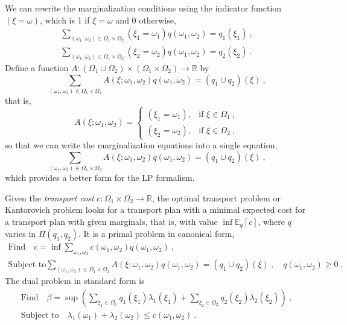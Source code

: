 \documentclass[axioms,article,submit,pdftex,moreauthors]{Definitions/mdpi}
\theoremstyle{plain}
\theoremstyle{remark}
\newcommand{\Expectation}{\mathbb E}
\newcommand{\expectat}[2]{\Expectation_{#1}\left[#2\right]}
\newcommand{\reals}{\mathbb{R}}
\begin{document}
We can rewrite the marginalization conditions using the indicator function \((\xi = \omega)\), which is 1 if \( \xi = \omega \) and 0 otherwise,
     \begin{gather*} 
     \sum_{(\omega_1, \omega_2) \in \Omega_1 \times \Omega_2} (\xi_1 = \omega_1) q(\omega_1, \omega_2) = q_1(\xi_1) \ ,
     \\
     \sum_{(\omega_1, \omega_2) \in \Omega_1 \times \Omega_2} (\xi_2 = \omega_2) q(\omega_1, \omega_2) = q_2(\xi_2) \ .
     \end{gather*} 
Define a function \( A : (\Omega_1 \cup \Omega_2) \times (\Omega_1 \times \Omega_2) \to \reals\) by
\begin{equation*} 
\sum_{(\omega_1, \omega_2) \in \Omega_1 \times \Omega_2} A(\xi; \omega_1, \omega_2) q(\omega_1, \omega_2) = (q_1 \cup q_2)(\xi) \ ,
\end{equation*} 
that is,
     \begin{equation*} 
     A(\xi; \omega_1, \omega_2) = 
     \begin{cases}
     (\xi_1 = \omega_1), & \text{if } \xi \in \Omega_1 \ , \\
     (\xi_2 = \omega_2), & \text{if } \xi \in \Omega_2 \ ,
     \end{cases}
     \end{equation*} 
so that we can write the marginalization equations into a single equation,
     \begin{equation*} 
     \sum_{(\omega_1, \omega_2) \in \Omega_1 \times \Omega_2} A(\xi; \omega_1, \omega_2) q(\omega_1, \omega_2) = (q_1 \cup q_2)(\xi) \ ,
     \end{equation*} 
which provides a better form for the LP formalism. 

Given the \emph{transport cost} \( c: \Omega_1 \times \Omega_2 \to \reals \), the optimal transport problem or Kantorovich problem looks for a transport plan with a minimal expected cost for a transport plan with given marginals, that is, with value $\inf \expectat q c$, where $q$ varies in $\Pi(q_1,q_2)$. It is a primal problem in canonical form,
\begin{gather} 
\text{Find}\quad c = \inf \sum_{\omega_1, \omega_2} c(\omega_1, \omega_2) q(\omega_1, \omega_2) \ , \\
\text{Subject to}
\sum_{(\omega_1, \omega_2) \in \Omega_1 \times \Omega_2} A(\xi; \omega_1, \omega_2) q(\omega_1, \omega_2) = (q_1 \cup q_2)(\xi)\ , 
\quad q(\omega_1, \omega_2) \geq 0 \ .
\end{gather}
The dual problem in standard form is
\begin{gather} 
\text{Find}\quad \beta = \sup \left( \sum_{\xi_1 \in \Omega_1} q_1(\xi_1) \lambda_1(\xi_1) + \sum_{\xi_2 \in \Omega_2} q_2(\xi_2) \lambda_2(\xi_2) \right) \ , \\
\text{Subject to} \quad 
\lambda_1(\omega_1) + \lambda_2(\omega_2) \leq c(\omega_1, \omega_2) \ .
\end{gather} 
\end{document}
